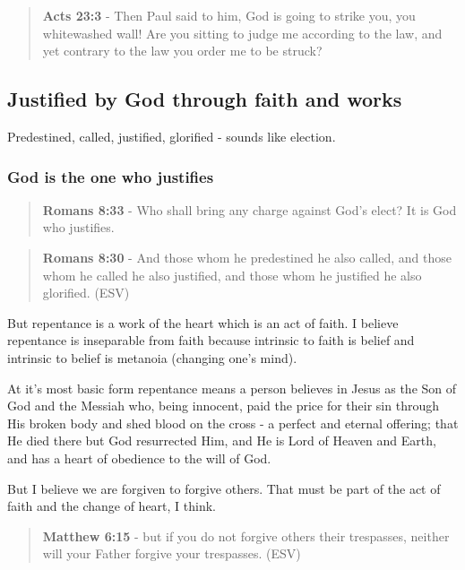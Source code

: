 \documentclass[11pt]{article}
\begin{document}
\begin{quote}
\textbf{Acts 23:3} - Then Paul said to him, God is going to strike you, you whitewashed wall! Are you sitting to judge me according to the law, and yet contrary to the law you order me to be struck?
\end{quote}

\subsection{Justified by God through faith and works}
\label{sec:org1fe95a4}
Predestined, called, justified, glorified - sounds like election.

\subsubsection{God is the one who justifies}
\label{sec:org7eaa84e}

\begin{quote}
\textbf{Romans 8:33} - Who shall bring any charge against God's elect? It is God who justifies.
\end{quote}

\begin{quote}
\textbf{Romans 8:30} - And those whom he predestined he also called, and those whom he called he also justified, and those whom he justified he also glorified. (ESV)
\end{quote}

But repentance is a work of the heart which is an act of faith.
I believe repentance is inseparable from faith because intrinsic to faith is belief and intrinsic to belief is metanoia (changing one's mind).

At it's most basic form repentance means a
person believes in Jesus as the Son of God and
the Messiah who, being innocent, paid the
price for their sin through His broken body
and shed blood on the cross - a perfect and
eternal offering; that He died there but God
resurrected Him, and He is Lord of Heaven and
Earth, and has a heart of obedience to the will of God.

But I believe we are forgiven to forgive others. That must be part of the act of faith and the change of heart, I think.

\begin{quote}
\textbf{Matthew 6:15} - but if you do not forgive others their trespasses, neither will your Father forgive your trespasses. (ESV)
\end{quote}
\end{document}
